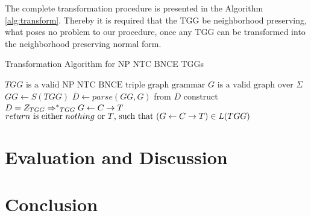 \documentclass[runningheads]{llncs}
\begin{document}
The complete transformation procedure is presented in the Algorithm \ref{alg:transform}. Thereby it is required that the TGG be neighborhood preserving, what poses no problem to our procedure, once any TGG can be transformed into the neighborhood preserving normal form. 


\begin{algorithm}[!h]
	\caption{Transformation Algorithm for NP NTC BNCE TGGs}
	\begin{algorithmic}[!ht]
		\Require $TGG \text{ is a valid NP NTC BNCE triple graph grammar}$
		\Require $G \text{ is a valid graph over } \Sigma$
		\State $GG \gets S(TGG)$ 
		\State $\overline{D} \gets parse(GG,G)$ 
		 
		\State from $\overline{D}$ construct $D = \startTG{TGG} \derivtr{}{}{TGG} G \ms{} C \mt{} T$
		\State {}
		\Else
		\State {} 
		\EndIf
		\EndFunction 
		\Ensure $return \text{ is either } nothing \text{ or } T \text{, such that } (G \overset{}{\leftarrow} C \overset{}{\rightarrow} T) \in L(TGG)$
	\end{algorithmic}
	\label{alg:transform}
\end{algorithm}


\section{Evaluation and Discussion}
\label{sec:eval}

\section{Conclusion}
\label{sec:conclusion}




%
%
%


\end{document}
